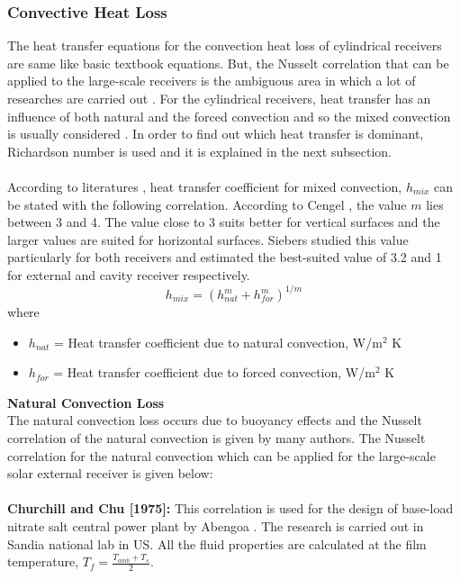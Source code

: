 \subsubsection{Convective Heat Loss}
The heat transfer equations for the convection heat loss of cylindrical receivers are same like basic textbook equations. But, the Nusselt correlation that can be applied to the large-scale receivers is the ambiguous area in which a lot of researches are carried out \cite{Siebers.1984} \cite{Cengel.2003}. For the cylindrical receivers, heat transfer has an influence of both natural and the forced convection and so the mixed convection is usually considered \cite{Siebers.1984}. In order to find out which heat transfer is dominant, Richardson number is used \cite{Teichel.2011} and it is explained in the next subsection.\\\\
According to literatures \cite{Cengel.2003} \cite{Siebers.1984}, heat transfer coefficient for mixed convection, $h_{mix}$ can be stated with the following correlation. According to Cengel \cite{Cengel.2003}, the value $m$ lies between 3 and 4. The value close to 3 suits better for vertical surfaces and the larger values are suited for horizontal surfaces. Siebers \cite{Siebers.1984} studied this value particularly for both receivers and estimated the best-suited value of 3.2 and 1 for external and cavity receiver respectively.
\begin{equation}
\label{mixed_convection}
h_{mix} = (h_{nat}^m + h_{for}^m)^{1/m}
\end{equation}
where 
\begin{itemize}
	\item $h_{nat}$  = Heat transfer coefficient due to natural convection, W/m$^2$ K 
	\item $h_{for}$ = Heat transfer coefficient due to forced convection, W/m$^2$ K 
\end{itemize}
\textbf{Natural Convection Loss}\\[0.25cm]
The natural convection loss occurs due to buoyancy effects and the Nusselt correlation of the natural convection is given by many authors. The Nusselt correlation for the natural convection which can be applied for the large-scale solar external receiver is given below:\\\\
\textbf{Churchill and Chu [1975]:}
This correlation is used for the design of base-load nitrate salt central power plant by Abengoa \cite{Tilley.2014}. The research is carried out in Sandia national lab in US. All the fluid properties are calculated at the film temperature, $T_f = \frac{T_{amb}+T_s}{2}$.
